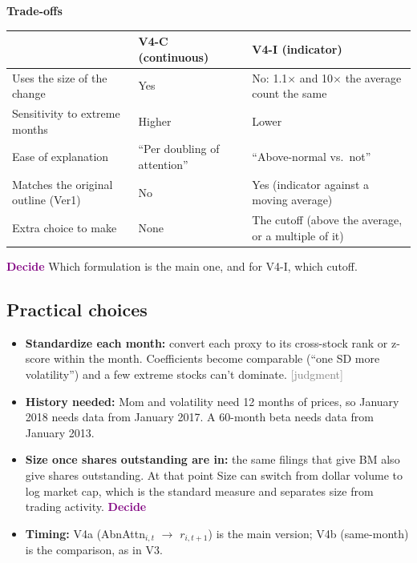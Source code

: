 \documentclass[11pt]{article}
\newcommand{\decide}{\textcolor{Purple}{\textbf{Decide}}}
\newcommand{\judg}{\textcolor{Gray}{\textsf{[judgment]}}}
\begin{document}
\textbf{Trade-offs}
\begin{center}\small
\begin{tabularx}{\textwidth}{>{\raggedright}p{3.4cm} >{\raggedright}X >{\raggedright\arraybackslash}X}
\toprule
 & V4-C (continuous) & V4-I (indicator)\\
\midrule
Uses the size of the change & Yes & No: 1.1$\times$ and 10$\times$ the average count the same\\
Sensitivity to extreme months & Higher & Lower\\
Ease of explanation & ``Per doubling of attention'' & ``Above-normal vs.\ not''\\
Matches the original outline (Ver1) & No & Yes (indicator against a moving average)\\
Extra choice to make & None & The cutoff (above the average, or a multiple of it)\\
\bottomrule
\end{tabularx}
\end{center}
\decide{} Which formulation is the main one, and for V4-I, which cutoff.

\subsection*{Practical choices}
\begin{itemize}
  \item \textbf{Standardize each month:} convert each proxy to its cross-stock rank or z-score within the month. Coefficients become comparable (``one SD more volatility'') and a few extreme stocks can't dominate. \judg{}
  \item \textbf{History needed:} Mom and volatility need 12 months of prices, so January 2018 needs data from January 2017. A 60-month beta needs data from January 2013.
  \item \textbf{Size once shares outstanding are in:} the same filings that give BM also give shares outstanding. At that point Size can switch from dollar volume to log market cap, which is the standard measure and separates size from trading activity. \decide{}
  \item \textbf{Timing:} V4a (AbnAttn$_{i,t}$ $\rightarrow$ $r_{i,t+1}$) is the main version; V4b (same-month) is the comparison, as in V3.
\end{itemize}
\end{document}
